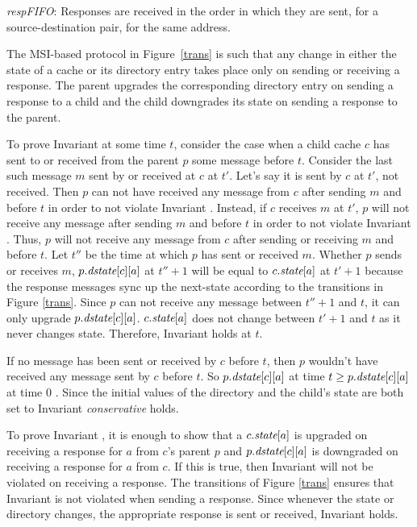 \begin{inv}
\textit{respFIFO}: Responses are received in the order in which they are sent,
for a source-destination pair, for the same address.
\end{inv}

The MSI-based protocol in Figure~\ref{trans} is such that any change in either
the state of a cache or its directory entry takes place only on sending or
receiving a response. The parent upgrades the corresponding directory entry on
sending a response to a child and the child downgrades its state on
sending a response to the parent.

To prove Invariant  at some time $t$, consider the case
when a child cache $c$ has sent to or received from the parent $p$ some message
before $t$. Consider the last such message $m$ sent by or received at $c$ at
$t'$. Let's say it is sent by $c$ at $t'$, not received. Then $p$ can not have
received any message from $c$ after sending $m$ and before $t$ in order to not
violate Invariant .  Instead, if $c$ receives $m$ at $t'$,
$p$ will not receive any message after sending $m$ and before $t$ in order to
not violate Invariant . Thus, $p$ will not receive any message
from $c$ after sending or receiving $m$ and before $t$.  Let $t''$ be the time
at which $p$ has sent or received $m$. Whether $p$ sends or receives $m$,
$p.\textit{dstate}[c][a]$ at $t''+1$ will be equal to $c.\textit{state}[a]$ at $t'+1$ because
the response messages sync up the next-state according to the transitions in
Figure \ref{trans}. Since $p$ can not receive any message between $t''+1$ and
$t$, it can only upgrade $p.\textit{dstate}[c][a]$. $c.\textit{state}[a]$ does not change
between $t'+1$ and $t$ as it never changes state. Therefore, Invariant
 holds at $t$.

If no message has been sent or received by $c$ before $t$, then $p$ wouldn't
have received any message sent by $c$ before $t$. So $p.\textit{dstate}[c][a]$ at time
$t \ge p.\textit{dstate}[c][a]$ at time $0$ . Since the initial values of the directory
and the child's state are both set to \In{} Invariant \textit{conservative}
holds.

To prove Invariant , it is enough to show that a
$c.\textit{state}[a]$ is upgraded on receiving a response for $a$ from $c$'s parent $p$
and $p.\textit{dstate}[c][a]$ is downgraded on receiving a response for $a$ from $c$.
If this is true, then Invariant  will not be
violated on receiving a response. The transitions of Figure \ref{trans} ensures
that Invariant  is not violated when sending a
response. Since whenever the state or directory changes, the appropriate
response is sent or received, Invariant  holds.

